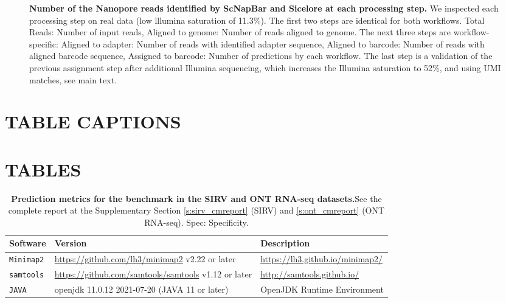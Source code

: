 \documentclass[times, 11pt, a4paper]{article}
\begin{document}
\begin{figure}[h!]
         \centering
         \label{fig:fc1realsteps}
        \caption{\textbf{Number of the Nanopore reads identified by ScNapBar and Sicelore at each processing step.}  We inspected each processing step on real data (low lllumina saturation of 11.3\%). The first two steps are identical for both workflows. Total Reads: Number of input reads, Aligned to genome: Number of reads aligned to genome. The next three steps are workflow-specific: Aligned to adapter: Number of reads with identified adapter sequence, Aligned to barcode: Number of reads with aligned barcode sequence, Assigned to barcode: Number of predictions by each workflow. The last step is a validation of the previous assignment step after additional Illumina sequencing, which increases the Illumina saturation to 52\%, and using UMI matches, see main text.}
        \label{fig:realsteps}
\end{figure}

\section*{TABLE CAPTIONS}
\section*{TABLES}

\begin{table}[]
\begin{tabular}{|p{2cm}|p{7cm}|p{7cm}|}
\hline 
            Software & Version & Description \\ 
            \hline \hline
            \texttt{Minimap2} & \url{https://github.com/lh3/minimap2} v2.22 or later & \url{https://lh3.github.io/minimap2/} \\ \hline
            \texttt{samtools} & \url{https://github.com/samtools/samtools} v1.12 or later & \url{http://samtools.github.io/} \\ \hline
	   \texttt{JAVA} & openjdk 11.0.12 2021-07-20 (JAVA 11 or later)& OpenJDK Runtime Environment\\ \hline
\end{tabular}
\caption{\textbf{Prediction metrics for the benchmark in the SIRV and ONT RNA-seq datasets.}\label{tab:benchmark} See the complete report at the Supplementary Section \ref{s:sirv_cmreport} (SIRV) and \ref{s:ont_cmreport} (ONT RNA-seq). Spec: Specificity.}
\end{table}
\end{document}
